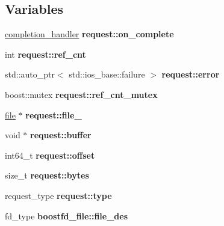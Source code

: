 \subsection*{Variables}
\begin{CompactItemize}
\item 
\hypertarget{group__iolayer_g2d9258e3443b499e4c641c2843bdc7a1}{
\hyperlink{classcompletion__handler}{completion\_\-handler} \textbf{request::on\_\-complete}}
\label{group__iolayer_g2d9258e3443b499e4c641c2843bdc7a1}

\item 
\hypertarget{group__iolayer_gbc00c1450db214bd32b3936d95730401}{
int \textbf{request::ref\_\-cnt}}
\label{group__iolayer_gbc00c1450db214bd32b3936d95730401}

\item 
\hypertarget{group__iolayer_g8f916a380f56a5017fdb196f76feaf31}{
std::auto\_\-ptr$<$ std::ios\_\-base::failure $>$ \textbf{request::error}}
\label{group__iolayer_g8f916a380f56a5017fdb196f76feaf31}

\item 
\hypertarget{group__iolayer_g341cdc5f009668b88edc9415720c6bc0}{
boost::mutex \textbf{request::ref\_\-cnt\_\-mutex}}
\label{group__iolayer_g341cdc5f009668b88edc9415720c6bc0}

\item 
\hypertarget{group__iolayer_gf25e69a9ec49b9aeb592ff28b9a1697e}{
\hyperlink{classfile}{file} $\ast$ \textbf{request::file\_\-}}
\label{group__iolayer_gf25e69a9ec49b9aeb592ff28b9a1697e}

\item 
\hypertarget{group__iolayer_g073eb2eba36110cc4362765aba803cdd}{
void $\ast$ \textbf{request::buffer}}
\label{group__iolayer_g073eb2eba36110cc4362765aba803cdd}

\item 
\hypertarget{group__iolayer_gbfc7b5f60fb16d3551e21fbba49d75dc}{
int64\_\-t \textbf{request::offset}}
\label{group__iolayer_gbfc7b5f60fb16d3551e21fbba49d75dc}

\item 
\hypertarget{group__iolayer_gffe23f8f72bfd5e016c3c7125740f96b}{
size\_\-t \textbf{request::bytes}}
\label{group__iolayer_gffe23f8f72bfd5e016c3c7125740f96b}

\item 
\hypertarget{group__iolayer_gcc85c654247d6d16afb0b1d63a7d3c8e}{
request\_\-type \textbf{request::type}}
\label{group__iolayer_gcc85c654247d6d16afb0b1d63a7d3c8e}

\item 
\hypertarget{group__iolayer_g65b30a12d73f0285c647967db6cfdd0c}{
fd\_\-type \textbf{boostfd\_\-file::file\_\-des}}
\label{group__iolayer_g65b30a12d73f0285c647967db6cfdd0c}


\end{CompactItemize}
